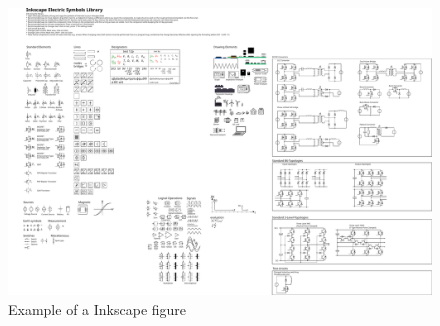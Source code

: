 \begin{figure}[ht]
	\centering
    \includegraphics[]{fig/inkscape/Inkscape_Symbols_All.pdf}
	\caption{Example of a Inkscape figure}
	\label{fig:inkscape_example}
\end{figure}

